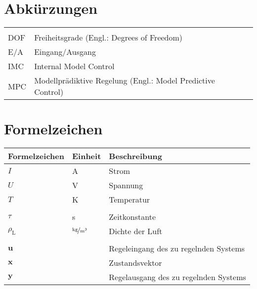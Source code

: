 
\section*{Abkürzungen}

\begin{flushleft}
\begin{tabularx}{\textwidth}{XlX}	
	&&\\
	DOF								&Freiheitsgrade (Engl.: Degrees of Freedom)&\\
	E/A								&Eingang/Ausgang &\\
	IMC								&Internal Model Control&\\
	MPC								&Modellprädiktive Regelung (Engl.: Model Predictive Control)&
\end{tabularx}
\end{flushleft}


\vspace{20mm}
\section*{Formelzeichen}


\begin{flushleft}
\begin{tabularx}{\textwidth}{llX}
	\toprule
	Formelzeichen					 	& Einheit									& Beschreibung \\
	\midrule
	$I$											&	A												&	Strom \\
	$U$											&	V												&	Spannung \\
	$T$											&	K												&	Temperatur \\
	&&\\
	$\tau$									&	s												& Zeitkonstante \\
	$\rho_{\mathrm{L}}$			&	$\unitfrac[]{kg}{m^3}$	& Dichte der Luft \\
	&&\\
	$\boldsymbol{u}$						& 												&	Regeleingang des zu regelnden Systems \\
	$\boldsymbol{x}$						& 												&	Zustandsvektor \\
	$\boldsymbol{y}$						& 												&	Regelausgang des zu regelnden Systems \\
\bottomrule
\end{tabularx}
\end{flushleft}
